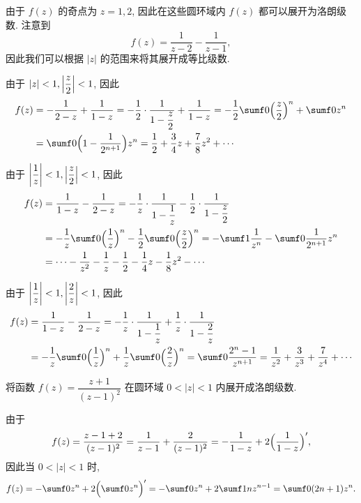 \begin{solution}
  由于 $f(z)$ 的奇点为 $z=1,2$, 因此在这些圆环域内 $f(z)$ 都可以展开为洛朗级数.
  注意到
  \[
    f(z)=\frac1{z-2}-\frac1{z-1},
  \]
  因此我们可以根据 $|z|$ 的范围来将其展开成等比级数.
  \begin{enumpar}
    \item 由于 $|z|<1,\left|\dfrac z2\right|<1$, 因此
      \begin{align*}
         f(z)&
        =-\frac1{2-z}+\frac1{1-z}
        =-\half\cdot\frac1{1-\dfrac z2}+\frac1{1-z}
        =-\half\sumf0 \Bigl(\frac z2\Bigr)^n+\sumf0 z^n\\&
        =\sumf0 \Bigl(1-\frac1{2^{n+1}}\Bigr)z^n
        =\frac12+\frac34z+\frac78z^2+\cdots
      \end{align*}
    \item 由于 $\left|\dfrac 1z\right|<1,\left|\dfrac z2\right|<1$, 因此
      \begin{align*}
         f(z)&
        =\frac1{1-z}-\frac1{2-z}
        =-\frac1z\cdot\frac1{1-\dfrac1z}-\half\cdot\frac1{1-\dfrac z2}\\&
        =-\frac1z\sumf0 \Bigl(\frac1z\Bigr)^n-\half\sumf0 \Bigl(\frac z2\Bigr)^n
        =-\sumf1 \frac1{z^n}-\sumf0 \frac1{2^{n+1}}z^n\\&
        =\cdots-\frac1{z^2}-\frac1z-\half -\frac14z-\frac18z^2-\cdots
      \end{align*}
    \item 由于 $\left|\dfrac 1z\right|<1,\left|\dfrac 2z\right|<1$, 因此
      \begin{align*}
         f(z)&
        =\frac1{1-z}-\frac1{2-z}
        =-\frac1z\cdot\frac1{1-\dfrac1z}+\frac1z\cdot\frac1{1-\dfrac2z}\\&
        =-\frac1z\sumf0 \Bigl(\frac1z\Bigr)^n+\frac1z\sumf0 \Bigl(\frac2z\Bigr)^n
        =\sumf0 \frac{2^n-1}{z^{n+1}}
        =\frac1{z^2}+\frac3{z^3}+\frac7{z^4}+\cdots
      \end{align*}
  \end{enumpar}
\end{solution}

\begin{example}
  将函数 $f(z)=\dfrac{z+1}{(z-1)^2}$ 在圆环域 $0<|z|<1$ 内展开成洛朗级数.
\end{example}

\begin{solution}
  由于
  \[
     f(z)
    =\frac{z-1+2}{(z-1)^2}
    =\frac1{z-1}+\frac{2}{(z-1)^2}
    =-\frac1{1-z}+2\Bigl(\frac1{1-z}\Bigr)',
  \]
  因此当 $0<|z|<1$ 时,
  \[
     f(z)
    =-\sumf0 z^n+2\Bigl(\sumf0 z^n\Bigr)'
    =-\sumf0 z^n+2\sumf1 nz^{n-1}
    =\sumf0 (2n+1)z^n.
  \]
\end{solution}

